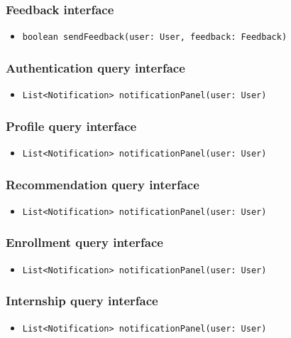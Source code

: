 \subsubsection{Feedback interface}
\begin{itemize}
    \item \verb|boolean sendFeedback(user: User, feedback: Feedback)|
\end{itemize}

\subsubsection{Authentication query interface}
\begin{itemize}
    \item \verb|List<Notification> notificationPanel(user: User)|
\end{itemize}

\subsubsection{Profile query interface}
\begin{itemize}
    \item \verb|List<Notification> notificationPanel(user: User)|
\end{itemize}

\subsubsection{Recommendation query interface}
\begin{itemize}
    \item \verb|List<Notification> notificationPanel(user: User)|
\end{itemize}

\subsubsection{Enrollment query interface}
\begin{itemize}
    \item \verb|List<Notification> notificationPanel(user: User)|
\end{itemize}

\subsubsection{Internship query interface}
\begin{itemize}
    \item \verb|List<Notification> notificationPanel(user: User)|
\end{itemize}

